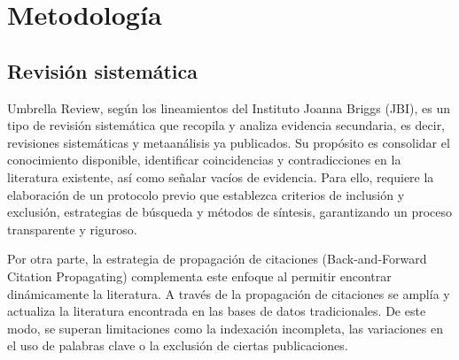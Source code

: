 \chapter{Metodología}
\section{Revisión sistemática}
\label{sec:revision-sistematica}
Umbrella Review, según los lineamientos del Instituto Joanna Briggs (JBI), es un tipo de revisión sistemática que recopila y analiza evidencia secundaria, 
es decir, revisiones sistemáticas y metaanálisis ya publicados.
Su propósito es consolidar el conocimiento disponible, identificar coincidencias y contradicciones en la literatura existente, así como señalar vacíos de evidencia.
Para ello, requiere la elaboración de un protocolo previo que establezca criterios de inclusión y exclusión, estrategias de búsqueda y métodos de síntesis, garantizando 
un proceso transparente y riguroso.

Por otra parte, la estrategia de propagación de citaciones (Back-and-Forward Citation Propagating) complementa este enfoque al permitir encontrar dinámicamente la literatura. 
A través de la propagación de citaciones se amplía y actualiza la literatura encontrada en las bases de datos tradicionales. De este modo, se superan limitaciones como la 
indexación incompleta, las variaciones en el uso de palabras clave o la exclusión de ciertas publicaciones.



